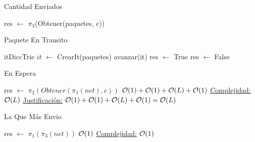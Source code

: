 \begin{Algoritmos}
\begin{algorithm}
\caption{Cantidad Enviados}
\begin{algorithmic}[1]
   \State res $\gets$ $\pi_3$(Obtener(paquetes, c))
  \EndProcedure
\end{algorithmic}
\end{algorithm}


\begin{algorithm}
\caption{Paquete En Transito}
\begin{algorithmic}[1]
   \State itDiccTrie $it$ $\gets$ CrearIt(paquetes)
   \State avanzar(it)
	\EndWhile
	\State res $\gets$   True
	\Else 
	\State res $\gets$ False
	\EndIf 
  \EndProcedure
\end{algorithmic}
\end{algorithm}




\begin{algorithm}
\caption{En Espera}
\begin{algorithmic}[1]
    \State res $\gets$ $\pi_2(Obtener(\pi_1(net),c))$ \Comment $\mathcal{O}(1)+\mathcal{O}(1)+\mathcal{O}(L)+\mathcal{O}(1)$
  \EndProcedure
  \underline{Complejidad:} $\mathcal{O}(L)$
 \underline{Justificación:} $\mathcal{O}(1)+\mathcal{O}(1)+\mathcal{O}(L)+\mathcal{O}(1) = \mathcal{O}(L)$

\end{algorithmic}
\end{algorithm}


\begin{algorithm}
\caption{La Que Más Envio}
\begin{algorithmic}[1]
   \State res $\gets$   $\pi_1(\pi_3(net))$ \Comment $\mathcal{O}(1)$
  \EndProcedure
  \underline{Complejidad:} $\mathcal{O}(1)$
\end{algorithmic}
\end{algorithm}



\end{Algoritmos}

